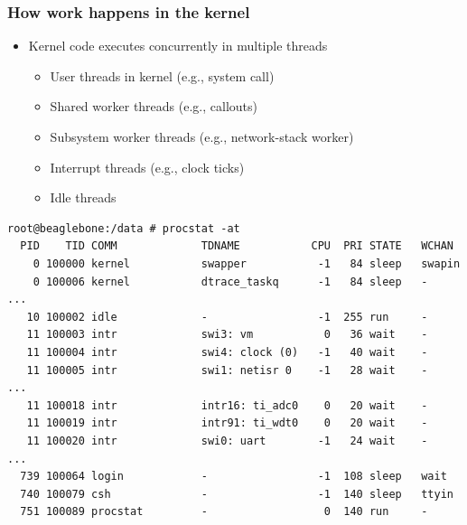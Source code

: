 \begin{frame}[fragile]
  \frametitle{How work happens in the kernel}

  \begin{itemize}
    \item Kernel code executes concurrently in multiple threads
    \begin{itemize}
      \item User threads in kernel (e.g., system call)
      \item Shared worker threads (e.g., callouts)
      \item Subsystem worker threads (e.g., network-stack worker)
      \item Interrupt threads (e.g., clock ticks)
      \item Idle threads
    \end{itemize}
  \end{itemize}

  \pause

  \begin{tiny}
\begin{verbatim}
root@beaglebone:/data # procstat -at
  PID    TID COMM             TDNAME           CPU  PRI STATE   WCHAN    
    0 100000 kernel           swapper           -1   84 sleep   swapin    
    0 100006 kernel           dtrace_taskq      -1   84 sleep   -         
...
   10 100002 idle             -                 -1  255 run     -         
   11 100003 intr             swi3: vm           0   36 wait    -         
   11 100004 intr             swi4: clock (0)   -1   40 wait    -         
   11 100005 intr             swi1: netisr 0    -1   28 wait    -         
...
   11 100018 intr             intr16: ti_adc0    0   20 wait    -         
   11 100019 intr             intr91: ti_wdt0    0   20 wait    -         
   11 100020 intr             swi0: uart        -1   24 wait    -         
...
  739 100064 login            -                 -1  108 sleep   wait      
  740 100079 csh              -                 -1  140 sleep   ttyin     
  751 100089 procstat         -                  0  140 run     -         
\end{verbatim}
  \end{tiny}
\end{frame}

